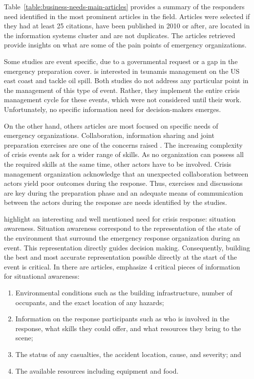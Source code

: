 Table~\ref{table:business-needs-main-articles} provides a summary of the responders need identified in the most prominent articles in the field.
Articles were selected if they had at least 25 citations, have been published in 2010 or after, are located in the information systems cluster and are not duplicates.
The articles retrieved provide insights on what are some of the pain points of emergency organizations.

Some studies are event specific, due to a governmental request or a gap in the emergency preparation cover.
\textcite{lindellTsunamiPreparednessOregon2010} is interested in tsunamis management on the US east coast and \textcite{cabreraaguileraModellingPerformanceVariabilities2016} tackle oil spill.
Both studies do not address any particular point in the management of this type of event.
Rather, they implement the entire crisis management cycle for these events, which were not considered until their work.
Unfortunately, no specific information need for decision-makers emerges.

On the other hand, others articles are most focused on specific needs of emergency organizations.
Collaboration, information sharing and joint preparation exercises are one of the concerns raised \parencite{berlinWhyCollaborationMinimised2011,parkerSurfaceWaterFlood2011}.
The increasing complexity of crisis events ask for a wider range of skills.
As no organization can possess all the required skills at the same time, other actors have to be involved.
Crisis management organization acknowledge that an unexpected collaboration between actors yield poor outcomes during the response.
Thus, exercises and discussions are key during the preparation phase and an adequate means of communication between the actors during the response are needs identified by the studies.

\textcite{yangDesignPrinciplesIntegrated2012} highlight an interesting and well mentioned need for crisis response: situation awareness.
Situation awareness correspond to the representation of the state of the environment that surround the emergency response organization during an event.
This representation directly guides decision making.
Consequently, building the best and most accurate representation possible directly at the start of the event is critical.
In there are articles, \citeauthor{yangDesignPrinciplesIntegrated2012} emphasize 4 critical pieces of information for situational awareness:

\begin{enumerate}
    \item Environmental conditions such as the building infrastructure, number of occupants, and the exact location of any hazards;
    \item Information on the response participants such as who is involved in the response, what skills they could offer, and what resources they bring to the scene;
    \item The status of any casualties, the accident location, cause, and severity; and
    \item The available resources including equipment and food.
\end{enumerate}

